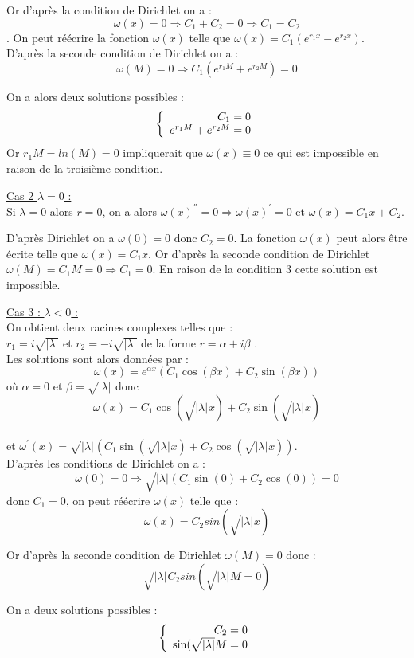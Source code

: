 \documentclass[fleqn,10pt]{SelfArx}
\begin{document}
Or d'après la condition de Dirichlet on a :
$$\omega(x)=0 \Rightarrow C_1 + C_2=0  \Rightarrow C_1 =C_2$$.
On peut réécrire la fonction $\omega(x)$ telle que $\omega(x)= C_1(e^{r_1x}- e^{r_2x })$.\\
D'après la seconde condition de Dirichlet on a :
$$\omega(M) = 0  \Rightarrow C_1(e^{r_1M}+e^{r_2M}) =0 $$

On a alors deux solutions possibles :
\[
\left\{
\begin{array}{r c l}
C_1 =0\\
e^{r_1M} + e^{r_2M} =0
\end{array}
\right.
\]
Or $r_1M = ln(M)=0$ impliquerait que $\omega(x) \equiv 0$ ce qui est impossible en raison de la troisième condition.

\underline{Cas 2  $\lambda = 0$ :}\\
Si $\lambda = 0$ alors $r=0$, on a alors $\omega(x)^{''}=0\Rightarrow \omega(x)^{'}=0$ et $\omega(x)=C_1x+C_2 $.

D'après Dirichlet on a $\omega(0)=0$  donc $C_2=0$. La fonction $\omega(x)$ peut alors être écrite telle que $\omega(x)=C_1x$. Or d'après la seconde condition de Dirichlet $\omega(M)= C_1M = 0 \Rightarrow C_1=0$. En raison de la condition 3 cette solution est impossible.

\underline{Cas 3 : $\lambda < 0$ :}\\
On obtient deux racines complexes telles que : \\
$r_1 = i\sqrt{|\lambda|} $ et $r_2 = -i\sqrt{|\lambda|}$ de la forme $r = \alpha + i\beta$  .\\
Les solutions sont alors données par :
$$ \omega(x) = e^{\alpha x}(C_1 \cos(\beta x) + C_2 \sin(\beta x) ) $$
où $\alpha = 0$ et $\beta = \sqrt{|\lambda|}$ donc $$\omega(x) =C_1 \cos(\sqrt{|\lambda|} x) + C_2 \sin(\sqrt{|\lambda|} x)$$ \\
et $\omega^\prime(x) =\sqrt{|\lambda|}(C_1 \sin(\sqrt{|\lambda|} x) + C_2 \cos(\sqrt{|\lambda|} x)) $. \\
D'après les conditions de Dirichlet on a :
$$ \omega(0)=0 \Rightarrow \sqrt{|\lambda|}(C_1 \sin(0) + C_2 \cos(0)) =0$$
donc $C_1=0$, on peut réécrire $\omega(x)$ telle que :
$$\omega(x) = C_2 sin(\sqrt{|\lambda|}x)$$

Or d'après la seconde condition de Dirichlet $\omega(M)=0$ donc : 
$$\sqrt{|\lambda|}C_2sin(\sqrt{|\lambda|}M=0)$$

On a deux solutions possibles :
\[
\left\{
\begin{array}{r c l}
C_2 =0\\
\sin(\sqrt{|\lambda |}M  =0
\end{array}
\right.
\]
\end{document}
